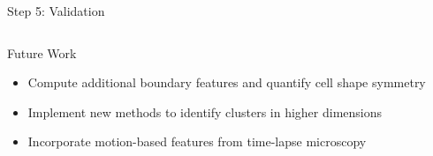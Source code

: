 \documentclass[final,hyperref={pdfpagelabels=false}]{beamer}
\begin{document}
\begin{frame}[t]
\begin{columns}[t]
\begin{column}{.465\textwidth}
\begin{block}{Step 5: Validation}
\begin{columns}
\end{columns}

\end{block}


\begin{block}{Future Work}
\begin{itemize}
\item Compute additional boundary features and quantify cell shape symmetry 
\item Implement new methods to identify clusters in higher dimensions 
\item Incorporate motion-based features from time-lapse microscopy
\end{itemize}
\end{block}


\end{column} 

\begin{column}{.015\textwidth}
\end{column} 

\end{columns} 

\end{frame}
\end{document}

